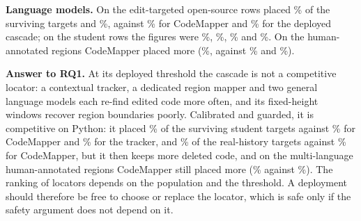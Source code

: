 \textbf{Language models.} On the edit-targeted open-source rows \wjModel{} placed \wjPubSelfPlace\% of the surviving targets and \wjNemoModel{} \wjNemoPubSelfPlace\%, against \wjPubCmQPlace\% for CodeMapper and \wjPubDepPlace\% for the deployed cascade; on the student rows the figures were \wjStuSelfPlace\%, \wjNemoStuSelfPlace\%, \wjStuCmQPlace\% and \wjStuDepPlace\%. On the human-annotated regions CodeMapper placed more (\wjHumCmQPlace\%, against \wjHumSelfPlace\% and \wjNemoHumSelfPlace\%).

\textbf{Answer to RQ1.} At its deployed threshold the cascade is not a competitive locator: a contextual tracker, a dedicated region mapper and two general language models each re-find edited code more often, and its fixed-height windows recover region boundaries poorly. Calibrated and guarded, it is competitive on Python: it placed \wiStuCalGiPlace\% of the surviving student targets against \wiStuCmQPlace\% for CodeMapper and \wiStuTrQPlace\% for the tracker, and \wiRealCalGiPlace\% of the real-history targets against \wiRealCmQPlace\% for CodeMapper, but it then keeps more deleted code, and on the multi-language human-annotated regions CodeMapper still placed more (\wiHumCmQPlace\% against \wiHumCalGiPlace\%). The ranking of locators depends on the population and the threshold. A deployment should therefore be free to choose or replace the locator, which is safe only if the safety argument does not depend on it.

